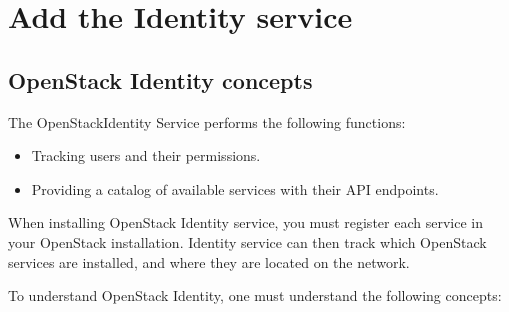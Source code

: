 \section{Add the Identity service}
    \subsection{OpenStack Identity concepts}

    \par The OpenStackIdentity Service performs the following functions:

    \begin{itemize}
        \item Tracking users and their permissions.
        \item Providing a catalog of available services with their API endpoints.
    \end{itemize}

    \par When installing OpenStack Identity service, you must register each service in your OpenStack installation. Identity service can then track which OpenStack services are installed, and where they are located on the network.

    \par To understand OpenStack Identity, one must understand the following concepts:

